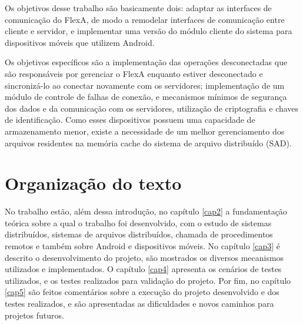     Os objetivos desse trabalho são basicamente dois: adaptar as interfaces de comunicação do FlexA, de modo a remodelar interfaces de comunicação entre cliente e servidor, e implementar uma versão do módulo cliente do sistema para dispositivos móveis que utilizem Android.

    Os objetivos específicos são a implementação das operações desconectadas que são responsáveis por gerenciar o FlexA enquanto estiver desconectado e sincronizá-lo ao conectar novamente com os servidores; implementação de um módulo de controle de falhas de conexão, e mecanismos mínimos de segurança dos dados e da comunicação com os servidores, utilização de criptografia e chaves de identificação. Como esses dispositivos possuem uma capacidade de armazenamento menor, existe a necessidade de um melhor gerenciamento dos arquivos residentes na memória cache do sistema de arquivo distribuído (SAD).

\section{Organização do texto}

    No trabalho estão, além dessa introdução, no capítulo \ref{cap2} a fundamentação teórica sobre a qual o trabalho foi desenvolvido, com o estudo de sistemas distribuídos, sistemas de arquivos distribuídos, chamada de procedimentos remotos e também sobre Android e dispositivos móveis. No capítulo \ref{cap3} é descrito o desenvolvimento do projeto, são mostrados os diversos mecanismos utilizados e implementados. O capítulo \ref{cap4} apresenta os cenários de testes utilizados, e os testes realizados para validação do projeto. Por fim, no capítulo \ref{cap5} são feitos comentários sobre a execução do projeto desenvolvido e dos testes realizados, e são apresentadas as dificuldades e novos caminhos para projetos futuros.
    